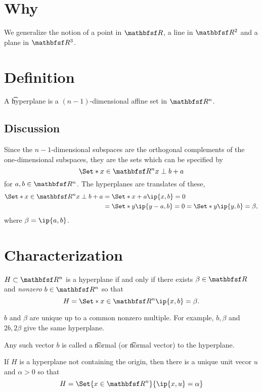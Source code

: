 
\section*{Why}

We generalize the notion of a point in $\R $, a line in $\R ^2$ and a plane in $\R ^3$.

\section*{Definition}

A \t{hyperplane} is a $(n-1)$-dimensional affine set in $\R ^n$.

\subsection*{Discussion}

Since the $n-1$-dimensional subspaces are the orthogonal complements of the one-dimensional subspaces, they are the sets which can be specified by
\[
\Set*{x \in \R ^n}{x \perp  b} + a
\]
for $a, b \in \R ^n$.
The hyperplanes are translates of these,
\[
\begin{aligned}
\Set*{x \in \R ^n}{x \perp  b} + a &= \Set*{x + a}{\ip{x,b} = 0} \\
&= \Set*{y}{\ip{y - a,b} = 0} = \Set*{y}{\ip{y,b} = \beta }, \\
\end{aligned}
\]
where $\beta  = \ip{a,b}$.

\section*{Characterization}

\begin{proposition}
$H \subset \R ^n$ is a hyperplane if and only if there exists $\beta  \in \R $ and \textit{nonzero} $b \in \R ^n$ so that
\[
H = \Set*{x \in \R ^n}{\ip{x,b} = \beta }.
\]
\end{proposition}

\begin{remark}
$b$ and $\beta $ are unique up to a common nonzero multiple.
For example, $b, \beta $ and $2b, 2\beta $ give the same hyperplane.
\end{remark}

\begin{remark}
Any such vector $b$ is called a \t{normal} (or \t{normal vector}) to the hyperplane.
\end{remark}

\begin{remark}
If $H$ is a hyperplane not containing the origin, then there is a unique unit vecor $u$ and $\alpha  > 0$ so that
\[
H = \Set{x \in \R ^n}{\ip{x,u} = \alpha }
\]
\end{remark}

\blankpage